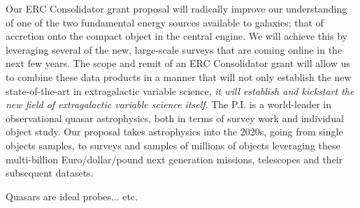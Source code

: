 \documentclass[11pt,a4paper]{article}
\begin{document}
Our ERC Consolidator grant proposal will radically improve our understanding of 
one of the two fundamental energy sources available to galaxies; that of accretion 
onto the compact object in the central engine. We will achieve this by leveraging 
several of the new, large-scale surveys that are coming online in the next few years. 
The scope and remit of an ERC Consolidator grant will allow us to combine these 
data products in a manner that will 
not only establish the new state-of-the-art in extragalactic variable science, 
{\it it will establish and kickstart the new field of extragalactic variable science itself}. 
The P.I. is a world-leader in observational quasar astrophysics, both in terms of 
survey work and individual object study. 
Our proposal takes astrophysics into the 2020s, going from single objects samples, 
to surveys and samples of millions of objects leveraging these multi-billion Euro/dollar/pound  
next generation missions, telescopes and their subsequent datasets. 

Quasars are ideal probes... etc. 

\begin{tcolorbox}

\end{tcolorbox}
\end{document}

